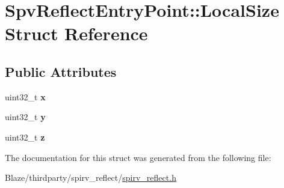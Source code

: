 \hypertarget{structSpvReflectEntryPoint_1_1LocalSize}{}\section{Spv\+Reflect\+Entry\+Point\+:\+:Local\+Size Struct Reference}
\label{structSpvReflectEntryPoint_1_1LocalSize}
\subsection*{Public Attributes}
\begin{DoxyCompactItemize}
\item 
\mbox{\label{structSpvReflectEntryPoint_1_1LocalSize_a90c94106a9721d09765c1c8302536860}} 
uint32\+\_\+t {\bfseries x}
\item 
\mbox{\label{structSpvReflectEntryPoint_1_1LocalSize_ab7c8694a7c3fb2d89fd62c2b8fe2d341}} 
uint32\+\_\+t {\bfseries y}
\item 
\mbox{\label{structSpvReflectEntryPoint_1_1LocalSize_a79e88b482ffb7f3d1771af060559c0ec}} 
uint32\+\_\+t {\bfseries z}
\end{DoxyCompactItemize}


The documentation for this struct was generated from the following file\+:\begin{DoxyCompactItemize}
\item 
Blaze/thirdparty/spirv\+\_\+reflect/\hyperlink{spirv__reflect_8h}{spirv\+\_\+reflect.\+h}\end{DoxyCompactItemize}
